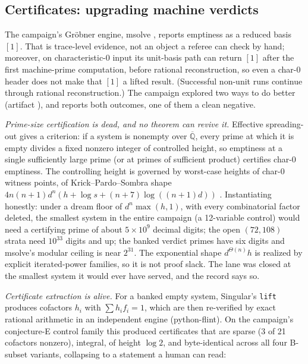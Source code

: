 \documentclass[11pt]{article}
\theoremstyle{definition}
\theoremstyle{remark}
\begin{document}
\subsection{Certificates: upgrading machine verdicts}\label{sec:cert}

The campaign's Gr\"obner engine, msolve \cite{msolve}, reports emptiness as a reduced basis $[1]$. That is trace-level evidence, not an object a referee can check by hand; moreover, on characteristic-$0$ input its unit-basis path can return $[1]$ after the first machine-prime computation, before rational reconstruction, so even a char-$0$ header does not make that $[1]$ a lifted result. (Successful non-unit runs continue through rational reconstruction.) The campaign explored two ways to do better (artifact ), and reports both outcomes, one of them a clean negative.

\emph{Prime-size certification is dead, and no theorem can revive it.} Effective spreading-out gives a criterion: if a system is nonempty over $\overline{\mathbb{Q}}$, every prime at which it is empty divides a fixed nonzero integer of controlled height, so emptiness at a single sufficiently large prime (or at primes of sufficient product) certifies char-$0$ emptiness. The controlling height is governed by worst-case heights of char-$0$ witness points, of Krick--Pardo--Sombra shape $4n(n+1)d^n(h+\log s+(n+7)\log((n+1)d))$ \cite{KPS}. Instantiating honestly: under a dream floor of $d^n\max(h,1)$, with every combinatorial factor deleted, the smallest system in the entire campaign (a 12-variable control) would need a certifying prime of about $5\times10^9$ decimal digits; the open $(72,108)$ strata need $10^{33}$ digits and up; the banked verdict primes have six digits and msolve's modular ceiling is near $2^{31}$. The exponential shape $d^{\Theta(n)}h$ is realized by explicit iterated-power families, so it is not proof slack. The lane was closed at the smallest system it would ever have served, and the record says so.

\emph{Certificate extraction is alive.} For a banked empty system, Singular's \texttt{lift} \cite{Singular} produces cofactors $h_i$ with $\sum h_if_i=1$, which are then re-verified by exact rational arithmetic in an independent engine (python-flint). On the campaign's conjecture-E control family this produced certificates that are sparse (3 of 21 cofactors nonzero), integral, of height $\log 2$, and byte-identical across all four B-subset variants, collapsing to a statement a human can read:
\end{document}
